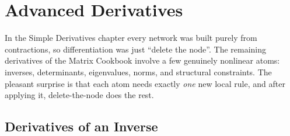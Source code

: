 
\chapter{Advanced Derivatives}
\label{chapter:advanced}

In the Simple Derivatives chapter every network was built purely from contractions,
so differentiation was just ``delete the node''.
The remaining derivatives of the Matrix Cookbook involve a few genuinely nonlinear atoms:
inverses, determinants, eigenvalues, norms, and structural constraints.
The pleasant surprise is that each atom needs exactly \emph{one} new local rule,
and after applying it, delete-the-node does the rest.

\section{Derivatives of an Inverse}

